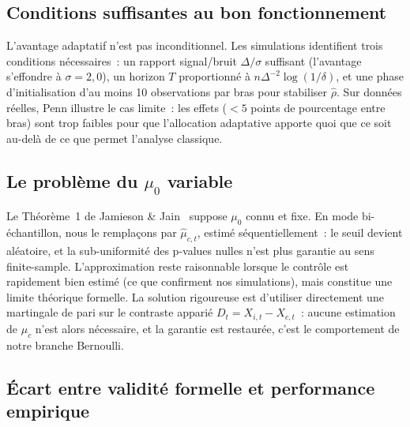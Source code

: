 \documentclass[10.5pt,a4paper]{article}
\begin{document}

\subsection{Conditions suffisantes au bon fonctionnement}

L'avantage adaptatif n'est pas inconditionnel. Les simulations identifient
trois conditions nécessaires~: un rapport signal/bruit $\Delta/\sigma$
suffisant (l'avantage s'effondre à $\sigma = 2{,}0$), un horizon $T$
proportionné à $n\Delta^{-2}\log(1/\delta)$, et une phase d'initialisation
d'au moins 10 observations par bras pour stabiliser $\hat{\rho}$.
Sur données réelles, Penn illustre le cas limite~: les effets ($<5$ points
de pourcentage entre bras) sont trop faibles pour que l'allocation adaptative
apporte quoi que ce soit au-delà de ce que permet l'analyse classique.

\subsection{Le problème du $\mu_0$ variable}

Le Théorème~1 de Jamieson \& Jain~\cite{jamieson2019} suppose $\mu_0$
connu et fixe. En mode bi-échantillon, nous le remplaçons par
$\hat{\mu}_{c,t}$, estimé séquentiellement~: le seuil devient aléatoire,
et la sub-uniformité des p-values nulles n'est plus garantie au sens
finite-sample. L'approximation reste raisonnable lorsque le contrôle est
rapidement bien estimé (ce que confirment nos simulations), mais constitue
une limite théorique formelle. La solution rigoureuse est d'utiliser
directement une martingale de pari sur le contraste apparié
$D_t = X_{i,t} - X_{c,t}$~: aucune estimation de $\mu_c$ n'est alors
nécessaire, et la garantie est restaurée, c'est le comportement de notre
branche Bernoulli.

\subsection{Écart entre validité formelle et performance empirique}
\end{document}
